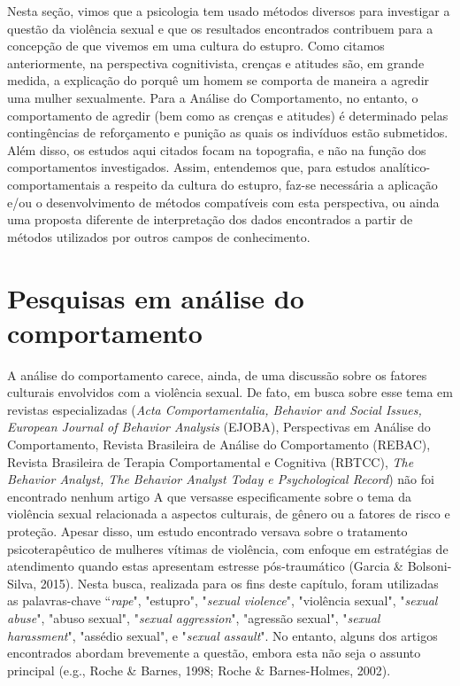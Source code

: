 Nesta seção, vimos que a psicologia tem usado métodos diversos para investigar a questão da violência sexual e que os resultados encontrados contribuem para a concepção de que vivemos em uma cultura do estupro. Como citamos anteriormente, na perspectiva cognitivista, crenças e atitudes são, em grande medida, a explicação do porquê um homem se comporta de maneira a agredir uma mulher sexualmente. Para a Análise do Comportamento, no entanto, o comportamento de agredir (bem como as crenças e atitudes) é determinado pelas contingências de reforçamento e punição as quais os indivíduos estão submetidos. Além disso, os estudos aqui citados focam na topografia, e não na função dos comportamentos investigados. Assim, entendemos que, para estudos analítico-comportamentais a respeito da cultura do estupro, faz-se necessária a aplicação e/ou o desenvolvimento de métodos compatíveis com esta perspectiva, ou ainda uma proposta diferente de interpretação dos dados encontrados a partir de métodos utilizados por outros campos de conhecimento.

\section*{Pesquisas em análise do comportamento}

A análise do comportamento carece, ainda, de uma discussão sobre os fatores culturais envolvidos com a violência sexual. De fato, em busca sobre esse tema em revistas especializadas (\textit{Acta Comportamentalia, Behavior and Social Issues, European Journal of Behavior Analysis} (EJOBA), Perspectivas em Análise do Comportamento, Revista Brasileira de Análise do Comportamento (REBAC), Revista Brasileira de Terapia Comportamental e Cognitiva (RBTCC), \textit{The Behavior Analyst, The Behavior Analyst Today e Psychological Record}) não foi encontrado nenhum artigo A que versasse especificamente sobre o tema da violência sexual relacionada a aspectos culturais, de gênero ou a fatores de risco e proteção. Apesar disso, um estudo encontrado versava sobre o tratamento psicoterapêutico de mulheres vítimas de violência, com enfoque em estratégias de atendimento quando estas apresentam estresse pós-traumático (Garcia \& Bolsoni-Silva, 2015). Nesta busca, realizada para os fins deste capítulo, foram utilizadas as palavras-chave ``\textit{rape}", "estupro", "\textit{sexual violence}", "violência sexual", "\textit{sexual abuse}", "abuso sexual", "\textit{sexual aggression}", "agressão sexual", "\textit{sexual harassment}", "assédio sexual", e "\textit{sexual assault}". No entanto, alguns dos artigos encontrados abordam brevemente a questão, embora esta não seja o assunto principal (e.g., Roche \& Barnes, 1998; Roche \& Barnes-Holmes, 2002).


